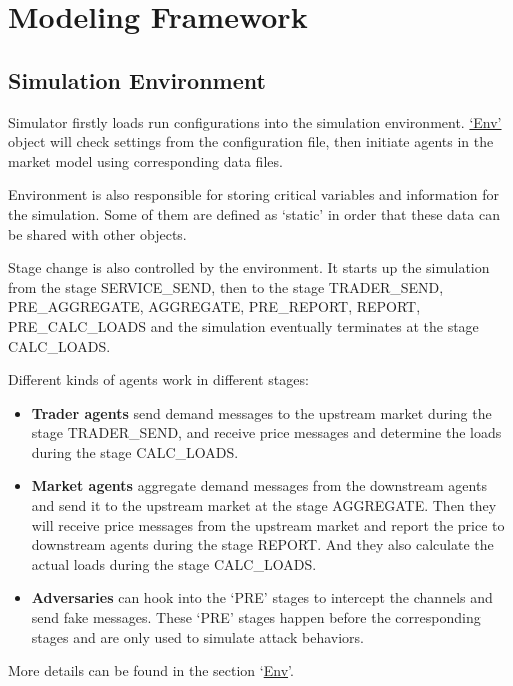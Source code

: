 \documentclass[12pt]{article}
\begin{document}
\section{Modeling Framework}
\label{sec:modeling}

\subsection{Simulation Environment} \mbox{}

Simulator firstly loads run configurations into the simulation environment. 
\hyperref[subsec:objects_env]{`Env'} object will check settings from the configuration file, 
then initiate agents in the market model using corresponding data files. 

Environment is also responsible for storing critical variables and information for the simulation. 
Some of them are defined as `static' in order that these data can be shared with other objects. 

Stage change is also controlled by the environment. 
It starts up the simulation from the stage SERVICE\_SEND, then to the stage TRADER\_SEND, PRE\_AGGREGATE, 
AGGREGATE, PRE\_REPORT, REPORT, PRE\_CALC\_LOADS and the simulation eventually terminates at the stage CALC\_LOADS. 

Different kinds of agents work in different stages: 
\begin{itemize} 
    \item{\textbf{Trader agents}} send demand messages to the upstream market during the stage TRADER\_SEND, 
    and receive price messages and determine the loads during the stage CALC\_LOADS. 
    \item{\textbf{Market agents}} aggregate demand messages from the downstream agents and 
    send it to the upstream market at the stage AGGREGATE. 
    Then they will receive price messages from the upstream market and report the price to downstream agents 
    during the stage REPORT. 
    And they also calculate the actual loads during the stage CALC\_LOADS.
    \item{\textbf{Adversaries}} can hook into the `PRE' stages to intercept the channels and send fake messages. 
    These `PRE' stages happen before the corresponding stages and are only used to simulate attack behaviors.
\end{itemize}

More details can be found in the section `\hyperref[subsec:objects_env]{Env}'. 
\end{document}
